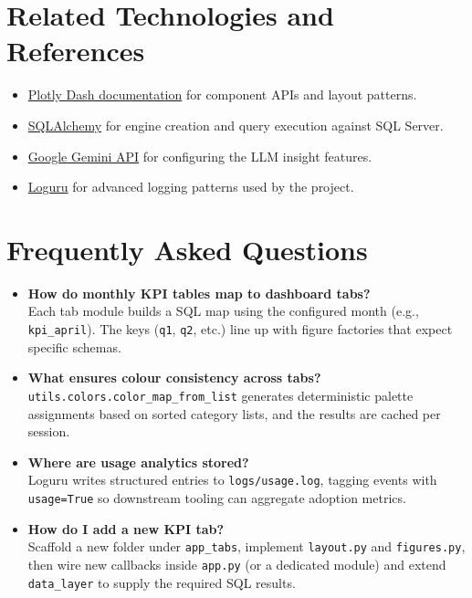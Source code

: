 \documentclass[12pt,a4paper]{article}
\begin{document}
\section{Related Technologies and References}

\begin{itemize}
    \item \href{https://dash.plotly.com/}{Plotly Dash documentation} for component APIs and layout patterns.
    \item \href{https://docs.sqlalchemy.org/}{SQLAlchemy} for engine creation and query execution against SQL Server.
    \item \href{https://ai.google.dev/docs/gemini_api_overview}{Google Gemini API} for configuring the LLM insight features.
    \item \href{https://loguru.readthedocs.io/}{Loguru} for advanced logging patterns used by the project.
\end{itemize}

\section{Frequently Asked Questions}

\begin{itemize}
    \item \textbf{How do monthly KPI tables map to dashboard tabs?}\\
    Each tab module builds a SQL map using the configured month (e.g., \texttt{kpi\_april}). The keys (\texttt{q1}, \texttt{q2}, etc.) line up with figure factories that expect specific schemas.
    \item \textbf{What ensures colour consistency across tabs?}\\
    \texttt{utils.colors.color\_map\_from\_list} generates deterministic palette assignments based on sorted category lists, and the results are cached per session.
    \item \textbf{Where are usage analytics stored?}\\
    Loguru writes structured entries to \texttt{logs/usage.log}, tagging events with \texttt{usage=True} so downstream tooling can aggregate adoption metrics.
    \item \textbf{How do I add a new KPI tab?}\\
    Scaffold a new folder under \texttt{app\_tabs}, implement \texttt{layout.py} and \texttt{figures.py}, then wire new callbacks inside \texttt{app.py} (or a dedicated module) and extend \texttt{data\_layer} to supply the required SQL results.
\end{itemize}
\end{document}
